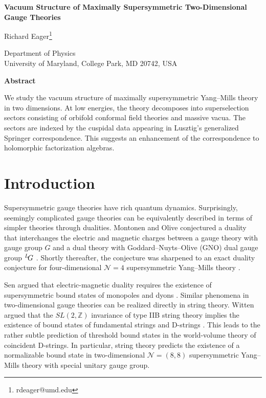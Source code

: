 \documentclass[12pt]{article}
\numberwithin{equation}{section}%
\theoremstyle{definition}
\newcommand{\bZ}{\mathbb{Z}}
\def\LG{{^L\negthinspace G}}
\begin{document}
\begin{titlepage}

\vskip 2cm

\begin{center}
{\large \bfseries
Vacuum Structure of Maximally Supersymmetric Two-Dimensional Gauge Theories
}

\vskip 1.2cm
Richard Eager\footnote{rdeager@umd.edu}
\bigskip
\bigskip

Department of Physics \\
University of Maryland, College Park, MD 20742, USA

\vskip 1.5cm

\textbf{Abstract}
\end{center}
We study the vacuum structure of maximally supersymmetric Yang--Mills theory in two dimensions.  At low energies, the theory decomposes into superselection sectors consisting of orbifold conformal field theories and massive vacua.  The sectors are indexed by the cuspidal data appearing in Lusztig's generalized Springer correspondence.  This suggests an enhancement of the correspondence to holomorphic factorization algebras.
\medskip
\noindent



\bigskip
\vfill
\end{titlepage}


\newpage 
\section{Introduction}
Supersymmetric gauge theories have rich quantum dynamics.  Surprisingly, seemingly complicated gauge theories can be equivalently described in terms of simpler theories through dualities.  Montonen and Olive conjectured a duality
that interchanges the electric and magnetic charges between a gauge theory with gauge group $G$ and a dual theory with Goddard--Nuyts--Olive (GNO) dual gauge group $\LG$ \cite{Montonen:1977sn, Goddard:1976qe}.  Shortly thereafter, the conjecture was sharpened to an exact duality conjecture for four-dimensional $\mathcal{N} = 4$ supersymmetric Yang--Mills theory \cite{Osborn:1979tq}.
 
Sen argued that electric-magnetic duality requires the existence of supersymmetric bound states of monopoles and dyons \cite{Sen:1994yi}.  Similar phenomena in two-dimensional gauge theories can be realized directly in string theory.  Witten argued that the $SL(2, \bZ)$ invariance of type IIB string theory implies the existence of bound states of fundamental strings and D-strings \cite{Witten:1995im}.  This leads to the rather subtle prediction of threshold bound states in the world-volume theory of coincident D-strings.  In particular, string theory predicts the existence of a normalizable bound state in two-dimensional $\mathcal{N} = (8,8)$ supersymmetric Yang--Mills theory with special unitary gauge group.  
\end{document}
